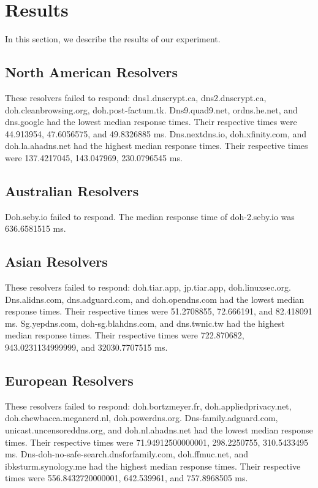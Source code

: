 \section{Results}\label{sec:results}
In this section, we describe the results of our experiment. 

\subsection{North American Resolvers}
These resolvers failed to respond: dns1.dnscrypt.ca, dns2.dnscrypt.ca, doh.cleanbrowsing.org, doh.post-factum.tk.
Dns9.quad9.net, ordns.he.net, and dns.google had the lowest median response times.
Their respective times were 44.913954, 47.6056575, and 49.8326885 ms. 
Dns.nextdns.io, doh.xfinity.com, and doh.la.ahadns.net had the highest median response times. 
Their respective times were 137.4217045, 143.047969, 230.0796545 ms. 

\subsection{Australian Resolvers}
Doh.seby.io failed to respond. 
The median response time of doh-2.seby.io was 636.6581515 ms. 

\subsection{Asian Resolvers}
These resolvers failed to respond: doh.tiar.app, jp.tiar.app, doh.linuxsec.org.
Dns.alidns.com, dns.adguard.com, and doh.opendns.com had the lowest median response times. 
Their respective times were 51.2708855, 72.666191, and  82.418091 ms. 
Sg.yepdns.com, doh-sg.blahdns.com, and dns.twnic.tw had the highest median response times. 
Their respective times were 722.870682, 943.0231134999999, and 32030.7707515 ms. 

\subsection{European Resolvers}
These resolvers failed to respond: doh.bortzmeyer.fr, doh.appliedprivacy.net, doh.chewbacca.meganerd.nl, doh.powerdns.org.
Dns-family.adguard.com, unicast.uncensoreddns.org, and doh.nl.ahadns.net had the lowest median response times.
Their respective times were 71.94912500000001, 298.2250755, 310.5433495 ms. 
Dns-doh-no-safe-search.dnsforfamily.com, doh.ffmuc.net, and ibksturm.synology.me had the highest median response times. 
Their respective times were 556.8432720000001, 642.539961, and 757.8968505 ms. 